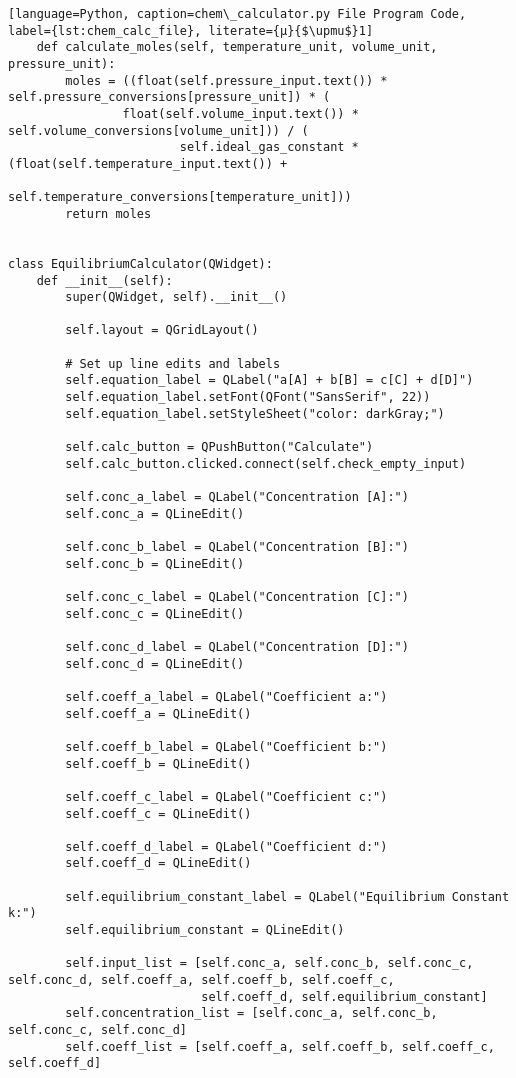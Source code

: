 \begin{lstlisting}[language=Python, caption=chem\_calculator.py File Program Code, label={lst:chem_calc_file}, literate={μ}{$\upmu$}1]
    def calculate_moles(self, temperature_unit, volume_unit, pressure_unit):
        moles = ((float(self.pressure_input.text()) * self.pressure_conversions[pressure_unit]) * (
                float(self.volume_input.text()) * self.volume_conversions[volume_unit])) / (
                        self.ideal_gas_constant * (float(self.temperature_input.text()) +
                                                   self.temperature_conversions[temperature_unit]))
        return moles


class EquilibriumCalculator(QWidget):
    def __init__(self):
        super(QWidget, self).__init__()

        self.layout = QGridLayout()

        # Set up line edits and labels
        self.equation_label = QLabel("a[A] + b[B] = c[C] + d[D]")
        self.equation_label.setFont(QFont("SansSerif", 22))
        self.equation_label.setStyleSheet("color: darkGray;")

        self.calc_button = QPushButton("Calculate")
        self.calc_button.clicked.connect(self.check_empty_input)

        self.conc_a_label = QLabel("Concentration [A]:")
        self.conc_a = QLineEdit()

        self.conc_b_label = QLabel("Concentration [B]:")
        self.conc_b = QLineEdit()

        self.conc_c_label = QLabel("Concentration [C]:")
        self.conc_c = QLineEdit()

        self.conc_d_label = QLabel("Concentration [D]:")
        self.conc_d = QLineEdit()

        self.coeff_a_label = QLabel("Coefficient a:")
        self.coeff_a = QLineEdit()

        self.coeff_b_label = QLabel("Coefficient b:")
        self.coeff_b = QLineEdit()

        self.coeff_c_label = QLabel("Coefficient c:")
        self.coeff_c = QLineEdit()

        self.coeff_d_label = QLabel("Coefficient d:")
        self.coeff_d = QLineEdit()

        self.equilibrium_constant_label = QLabel("Equilibrium Constant k:")
        self.equilibrium_constant = QLineEdit()

        self.input_list = [self.conc_a, self.conc_b, self.conc_c, self.conc_d, self.coeff_a, self.coeff_b, self.coeff_c,
                           self.coeff_d, self.equilibrium_constant]
        self.concentration_list = [self.conc_a, self.conc_b, self.conc_c, self.conc_d]
        self.coeff_list = [self.coeff_a, self.coeff_b, self.coeff_c, self.coeff_d]


\end{lstlisting}
